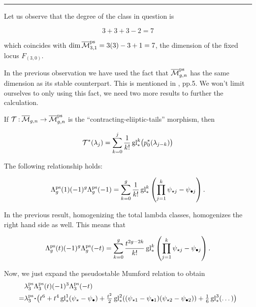 \documentclass[12pt]{memoir}
\begin{document}
    \hrule
\fi


\begin{Rmk}
    Let us observe that the degree of the class in question is

    \[3+3+3-2=7\]

    which coincides with \(\dim\overline{\mathcal{M}}^{\operatorname{\mathrm{ps}}}_{3,1}=3(3)-3+1=7\), the dimension of the fixed locus \(F_{(3,0)}\).
\end{Rmk}

In the previous observation we have used the fact that \(\overline{\mathcal{M}}^{\operatorname{\mathrm{ps}}}_{g,n}\) has the same dimension as its stable counterpart. This is mentioned in \cite{RenzoAndCo}, pp.5. We won't limit ourselves to only using this fact, we need two more results to further the calculation.

\begin{Th}\label{th-renzoco-defn-pslambda}
    If \(\mathcal{T}\mathbin{:}\overline{\mathcal{M}}_{g,n}\to\overline{\mathcal{M}}^{\operatorname{\mathrm{ps}}}_{g,n}\) is the ``contracting-eliiptic-tails'' morphism, then

    \[\mathcal{T}^\ast(\lambda_j)=\sum_{k=0}^{j}\frac{1}{k!}\operatorname{gl}_{\ast}^k\bigl(p_0^\ast(\lambda_{j-k})\bigr)\]

\end{Th}

\begin{Th}\label{th-matt-mumford-formula}
    The following relationship holds:

    \[\Lambda_g^{\operatorname{\mathrm{ps}}}(1)(-1)^g\Lambda_g^{\operatorname{\mathrm{ps}}}(-1)=\sum_{k=0}^{g}\frac{1}{k!}\operatorname{gl}_{\ast}^k\left(\prod_{j=1}^{k}\psi_{\star j}-\psi_{\bullet j}\right).\]

\end{Th}

In the previous result, homogenizing the total lambda classes, homogenizes the right hand side as well. This means that

\[\Lambda_g^{\operatorname{\mathrm{ps}}}(t)(-1)^g\Lambda_g^{\operatorname{\mathrm{ps}}}(-t)=\sum_{k=0}^{g}\frac{t^{2g-2k}}{k!}\operatorname{gl}_{\ast}^k\left(\prod_{j=1}^{k}\psi_{\star j}-\psi_{\bullet j}\right).
\]


Now, we just expand the pseudostable Mumford relation to obtain
\begin{align*}
      & \la_3^{\ps}\La_3^{\ps}(t)(-1)^3\La_3^{\ps}(-t)                                                                                                                                 \\
    = & \la_3^{\ps}\.\bigl(t^6+t^4\glu_\ast^1(\psi_\star-\psi_\8)+\tfrac{t^2}{2}\glu_\ast^2((\psi_{\star1}-\psi_{\81})(\psi_{\star2}-\psi_{\82}))+\tfrac{1}{6}\glu_\ast^3(\dots)\bigr)
\end{align*}
\end{document}
